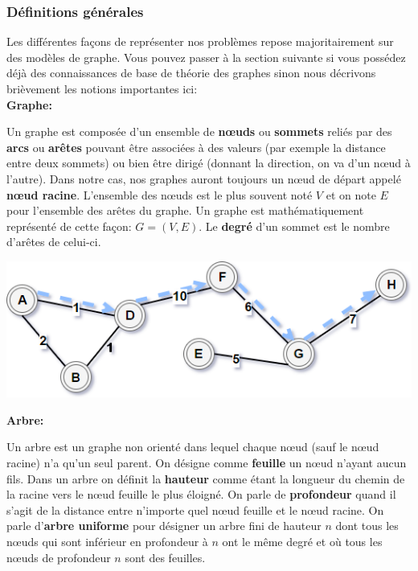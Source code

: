 \subsubsection{Définitions générales}
Les différentes façons de représenter nos problèmes repose majoritairement sur des modèles de graphe. Vous pouvez passer à la section suivante si vous possédez déjà des connaissances de base de théorie des graphes sinon nous décrivons brièvement les notions importantes ici:\\

{\setlength{\parindent}{0cm}\textbf{Graphe:}}

Un graphe est composée d'un ensemble de \textbf{nœuds} ou \textbf{sommets} reliés par des \textbf{arcs} ou \textbf{arêtes} pouvant être associées à des valeurs (par exemple la distance entre deux sommets) ou bien être dirigé (donnant la direction, on va d'un nœud à l'autre).
Dans notre cas, nos graphes auront toujours un nœud de départ appelé \textbf{nœud racine}.
L'ensemble des nœuds est le plus souvent noté $V$ et on note $E$ pour l'ensemble des arêtes du graphe. 
Un graphe est mathématiquement représenté de cette façon: $G = (V, E)$.
Le \textbf{degré} d'un sommet est le nombre d'arêtes de celui-ci.\\

\begin{center}
    \includegraphics[scale=0.6]{../ressources/images/example_graph.png}
\end{center}

{\setlength{\parindent}{0cm}\textbf{Arbre:}}

Un arbre est un graphe non orienté dans lequel chaque nœud (sauf le nœud racine) n'a qu'un seul parent. 
On désigne comme \textbf{feuille} un nœud n'ayant aucun fils.
Dans un arbre on définit la \textbf{hauteur} comme étant la longueur du chemin de la racine vers le nœud feuille le plus éloigné. On parle de \textbf{profondeur} quand il s'agit de la distance entre n'importe quel nœud feuille et le nœud racine.
On parle d'\textbf{arbre uniforme} pour désigner un arbre fini de hauteur $n$ dont tous les nœuds qui sont inférieur en profondeur à $n$ ont le même degré et où tous les nœuds de profondeur $n$ sont des feuilles.

